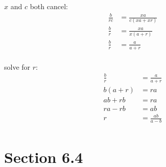 \documentclass{exam}
\begin{document}
\begin{description}
      $x$ and $c$ both cancel:
      \begin{align*}
        \frac{b}{rc} & = \frac{xa}{c(xa + xr)} \\
        \frac{b}{r} & = \frac{xa}{x(a + r)} \\
        \frac{b}{r}  & = \frac{a}{a + r} \\
      \end{align*}

      solve for $r$:
      \begin{align*}
        \frac{b}{r} & = \frac{a}{a + r} \\
        b(a + r)    & = ra \\
        ab + rb     & = ra \\
        ra - rb     & = ab \\
        r           & = \frac{ab}{a - b} \\
      \end{align*}
  \end{description}

  \ifprintanswers

    \section{Section 6.4}
\end{document}
